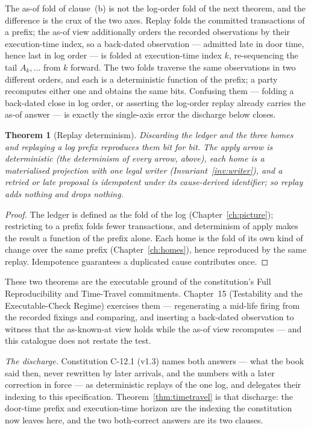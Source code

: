 \documentclass[11pt,a4paper]{article}
\newtheorem{theorem}[definition]{Theorem}
\begin{document}
The as-of fold of clause~(b) is not the log-order fold of the next theorem, and the
difference is the crux of the two axes. Replay folds the committed transactions of a
prefix; the as-of view additionally orders the recorded observations by their execution-time
index, so a back-dated observation --- admitted late in door time, hence last in
log order --- is folded at execution-time index $k$, re-sequencing the tail $A_k,\dots$ from $k$
forward. The two folds traverse the same observations in two different orders, and each is
a deterministic function of the prefix; a party recomputes either one and obtains the same
bits. Confusing them --- folding a back-dated close in log order, or asserting the log-order
replay already carries the as-of answer --- is exactly the single-axis error the discharge
below closes.

\begin{theorem}[Replay determinism]\label{thm:replay}
Discarding the ledger and the three homes and replaying a log prefix reproduces
them bit for bit. The apply arrow is deterministic (the determinism of every
arrow, above), each home is a materialised projection with one legal writer
(Invariant~\ref{inv:writer}), and a retried or late proposal is
idempotent under its cause-derived identifier; so replay adds nothing and drops
nothing.
\end{theorem}

\begin{proof}
The ledger is defined as the fold of the log (Chapter~\ref{ch:picture});
restricting to a prefix folds fewer transactions, and determinism of apply makes
the result a function of the prefix alone. Each home is the fold of its own kind
of change over the same prefix (Chapter~\ref{ch:homes}), hence reproduced by the
same replay. Idempotence guarantees a duplicated cause contributes once.
\end{proof}

These two theorems are the executable ground of the constitution's Full
Reproducibility and Time-Travel commitments. Chapter~15 (Testability and the
Executable-Check Regime) exercises them --- regenerating a mid-life firing from
the recorded fixings and comparing, and inserting a back-dated observation to
witness that the as-known-at view holds while the as-of view recomputes --- and
this catalogue does not restate the test.

\emph{The discharge.} Constitution C-12.1 (v1.3) names both answers --- what the book said
then, never rewritten by later arrivals, and the numbers with a later correction in force ---
as deterministic replays of the one log, and delegates their indexing to this specification.
Theorem~\ref{thm:timetravel} is that discharge: the door-time prefix and execution-time
horizon are the indexing the constitution now leaves here, and the two both-correct answers
are its two clauses.
\end{document}

